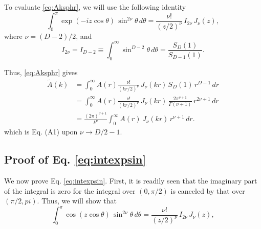 \documentclass[preprint]{revtex4-1}
\numberwithin{equation}{subsection}
\numberwithin{table}{section}
\begin{document}
To evaluate \eqref{eq:Aksphr},
we will use the following identity
\begin{equation}
  \int_0^\pi
  \exp(-iz\cos\theta) \,
  \sin^{2\nu} \theta \,
  d \theta
=
  \frac{ \nu! }{ (z/2)^\nu } \,
  I_{2 \nu} \, J_\nu(z),
  \label{eq:intexpsin}
\end{equation}
%
where $\nu = (D - 2)/2$,
and
\begin{equation}
  I_{2\nu}
=
  I_{D-2}
\equiv
  \int_0^\infty \sin^{D-2} \theta \, d\theta
=
\frac{ S_{D}(1) }
  { S_{D-1}(1) }.
\end{equation}

Thus, \eqref{eq:Aksphr} gives
\begin{align*}
  \tilde A(k)
&=
\int_0^\infty
A(r)
\frac{ \nu! } { (kr/2)^{\nu} } \, J_\nu(kr) \,
S_D(1) \, r^{D-1} \, dr
\\
&=
\int_0^\infty
A(r)
\frac{ \nu! } { (kr/2)^{\nu} } \, J_\nu(kr) \,
\frac{ 2 \pi^{\nu+1} }{ \Gamma(\nu+1) }
\, r^{2\nu+1} \, dr
\\
&=
\frac{(2\pi)^{\nu+1}}{k^{\nu}}
\int_0^\infty
A(r) \, J_\nu(kr) \,
r^{\nu+1} \, dr.
\end{align*}
which is Eq. (A1) upon $\nu \rightarrow D/2-1$.



\subsection{Proof of Eq. \eqref{eq:intexpsin} }



We now prove Eq. \eqref{eq:intexpsin}.
%
First, it is readily seen that
the imaginary part of the integral is zero
for the integral over $(0, \pi/2)$
is canceled by that over $(\pi/2, pi)$.
%
Thus, we will show that
\begin{equation}
  \int_0^\pi
  \cos(z\cos\theta) \,
  \sin^{2\nu} \theta \,
  d \theta
=
  \frac{ \nu! }{ (z/2)^\nu } \,
  I_{2 \nu} \, J_\nu(z),
  \label{eq:intccossin}
\end{equation}
\end{document}
